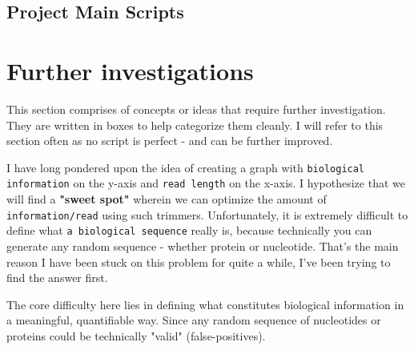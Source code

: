 \documentclass[11pt]{report}
\begin{document}
{\newpage

\pagestyle{fancy}
\fancyhf{}
\fancyhead[C]{\leftmark}  %
\fancyhead[R]{\thepage}




\chapter{Project Main Scripts}

\setcounter{section}{0}
\setcounter{subsection}{0}

\linenumbers*
\section{}
\setcounter{section}{1}
\setcounter{subsection}{0}


\newpage
\pagestyle{fancy}
\fancyhf{}
\fancyhead[C]{\leftmark}  %
\fancyhead[R]{\thepage}

\part{Further investigations}

\renewcommand{\thesection}{\arabic{section}}
\setcounter{section}{0}
\setcounter{subsection}{0}

This section comprises of concepts or ideas that require further investigation. They are written in boxes to help categorize them cleanly. I will refer to this section often as no script is perfect - and can be further improved. 

\begin{tcolorbox}[colback=gray!10!white, coltitle=white, colframe=gray!80!black, title=Biological Information]
	\label{box:biological information}
	I have long pondered upon the idea of creating a graph with \texttt{biological information} on the y-axis and \texttt{read length} on the x-axis. I hypothesize that we will find a \textbf{"sweet spot" }wherein we can optimize the amount of \texttt{information/read} using such trimmers. Unfortunately, it is extremely difficult to define what \texttt{a biological sequence} really is, because technically you can generate any random sequence - whether protein or nucleotide. That's the main reason I have been stuck on this problem for quite a while, I've been trying to find the answer first.
	
	The core difficulty here lies in defining what constitutes biological information in a meaningful, quantifiable way. Since any random sequence of nucleotides or proteins could be technically "valid" (false-positives). 
	

\end{tcolorbox}}
\end{document}
